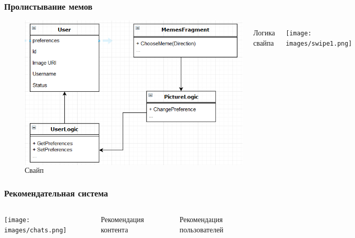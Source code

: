 \documentclass[xetex,mathserif,serif, xcolor=table]{beamer}
\begin{document}
	\begin{frame}
		\frametitle{Пролистывание мемов}
		\begin{figure}[h]
		\begin{columns}[t]
                    \includegraphics[scale=0.5]{images/swipe.png}
                    \caption{Логика свайпа}
                    \label{fig:image}
                    \texttt{[image: images/swipe1.png]}
                    \caption{Свайп}
                    \label{fig:image}
            \end{columns}
        \end{figure}
	\end{frame}	
	
	\begin{frame}
		\frametitle{Рекомендательная система}
		     \begin{columns}[t]
                    \begin{itemize}
                        \texttt{[image: images/chats.png]}
        			\end{itemize}
                    \item Рекомендация контента
        		    \item Рекомендация пользователей
            \end{columns}
	\end{frame}	
	
\end{document}
